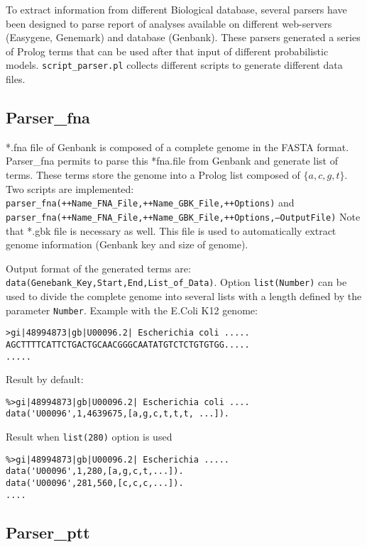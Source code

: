 \documentclass{book}
\begin{document}
To extract information from different Biological database, several parsers have been designed 
to parse report of analyses available on different web-servers (Easygene, Genemark) and database (Genbank). 
These parsers generated a series of Prolog terms that can be used after that
input of different probabilistic models. \texttt{script\_parser.pl} collects different scripts to generate
different data files.

\subsection{Parser\_fna}

*.fna file of Genbank is composed of a complete genome in the FASTA format.
Parser\_fna permits to parse this *fna.file from Genbank and generate
list of terms. These terms store the genome into a Prolog list
composed of $\{a,c,g,t\}$. Two scripts are implemented:\\ 
\texttt{parser\_fna(++Name\_FNA\_File,++Name\_GBK\_File,++Options)} and \\
\texttt{parser\_fna(++Name\_FNA\_File,++Name\_GBK\_File,++Options,--OutputFile)}
Note that *.gbk file is necessary as well. This file is used to automatically extract
genome information (Genbank key and size of genome).

Output format of the generated terms are:\\
\texttt{data(Genebank\_Key,Start,End,List\_of\_Data)}.
Option \texttt{list(Number)} can be used to divide the complete
genome into several lists with a length defined by the parameter
\texttt{Number}.
Example with the E.Coli K12 genome:
\begin{verbatim}
>gi|48994873|gb|U00096.2| Escherichia coli .....
AGCTTTTCATTCTGACTGCAACGGGCAATATGTCTCTGTGTGG.....
.....
\end{verbatim}
Result by default:
\begin{verbatim}
%>gi|48994873|gb|U00096.2| Escherichia coli ....
data('U00096',1,4639675,[a,g,c,t,t,t, ...]). 
\end{verbatim}
Result when \texttt{list(280)} option is used
\begin{verbatim}
%>gi|48994873|gb|U00096.2| Escherichia .....
data('U00096',1,280,[a,g,c,t,...]).
data('U00096',281,560,[c,c,c,...]).
....
\end{verbatim}


\subsection{Parser\_ptt}
\end{document}
